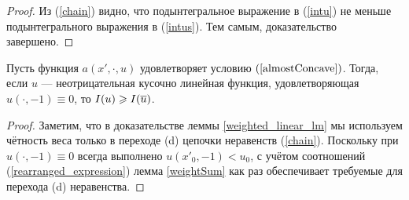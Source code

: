 \begin{proof}
Из (\ref{chain}) видно, что подынтегральное выражение в (\ref{intu}) не меньше
подынтегрального выражения в (\ref{intus}).
Тем самым, доказательство завершено.
\end{proof}

\begin{lm}
Пусть функция $a(x', \cdot, u)$ удовлетворяет условию $(\ref{almostConcave})$.
Тогда, если $u$ --- неотрицательная кусочно линейная функция, удовлетворяющая $u(\cdot, -1) \equiv 0$,
то $I( u ) \ge I( \mon{u} )$.
\end{lm}

\begin{proof}
Заметим, что в доказательстве леммы \ref{weighted_linear_lm}
мы используем чётность веса только в переходе (d) цепочки неравенств (\ref{chain}).
Поскольку при $u(\cdot, -1) \equiv 0$ всегда выполнено $u(x'_0, -1) < u_0$,
с учётом соотношений (\ref{rearranged_expression}) лемма \ref{weightSum} как раз обеспечивает требуемые для перехода (d) неравенства.
\end{proof}
